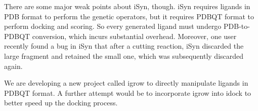 There are some major weak points about iSyn, though. iSyn requires ligands in PDB format to perform the genetic operators, but it requires PDBQT format to perform docking and scoring. So every generated ligand must undergo PDB-to-PDBQT conversion, which incurs substantial overhead. Moreover, one user recently found a bug in iSyn that after a cutting reaction, iSyn discarded the large fragment and retained the small one, which was subsequently discarded again.

We are developing a new project called igrow to directly manipulate ligands in PDBQT format. A further attempt would be to incorporate igrow into idock to better speed up the docking process.

\chapterend
